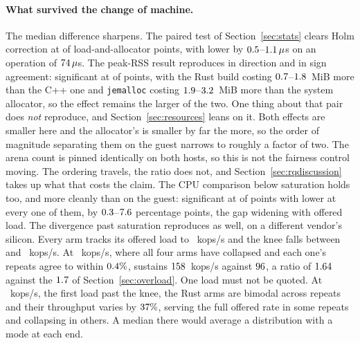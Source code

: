 \documentclass[english,oneside,a4paper,censored,csm,software-track-2020]{HYthesisML}
\begin{document}
\paragraph{What survived the change of machine.}
The median difference sharpens. The paired test of Section~\ref{sec:stats} clears Holm correction
at \BmPFiftySig{} of \BmPFiftyTested{} load-and-allocator points, with \BmPFiftyFaster{} lower by
$0.5$--$1.1\,\mu$s on an operation of $74\,\mu$s. The peak-RSS
result reproduces in direction and in sign agreement: significant at \BmRssSig{} of
\BmRssTested{} points, with the Rust build costing $0.7$--$1.8$~MiB more than
the C++ one and \texttt{jemalloc} costing $1.9$--$3.2$~MiB more than the
system allocator, so the \BmRssLargerEffect{} effect remains the larger of the two.
One thing about that pair does \emph{not} reproduce, and Section~\ref{sec:resources} leans on it.
Both effects are smaller here and the allocator's is smaller by far the more, so the order of
magnitude separating them on the guest narrows to roughly a factor of two. The arena count is pinned
identically on both hosts, so this is not the fairness control moving. The ordering travels, the
ratio does not, and Section~\ref{sec:rqdiscussion} takes up what that costs the claim.
The CPU comparison below saturation holds too, and more cleanly than on the guest: significant at
\BmCpuSig{} of \BmCpuTested{} points with \BmCpuLower{} lower at every one of them, by
$0.3$--$7.6$ percentage points, the gap widening with offered load.
The divergence past saturation reproduces as well, on a different vendor's silicon. Every arm
tracks its offered load to \BmTrackingMax{}~kops/s and the knee falls between \BmKneeLo{} and
\BmKneeHi{}~kops/s. At \BmOverloadLoad{}~kops/s, where all four arms have collapsed and each
one's repeats agree to within $0.4\%$, \BmOverloadFaster{} sustains
$158$~kops/s against $96$, a ratio of $1.64$ against
the $1.7$ of Section~\ref{sec:overload}.
One load must not be quoted. At \BmMetastableLoad{}~kops/s, the first load past the knee, the
Rust arms are bimodal across repeats and their throughput varies by $37\%$, serving
the full offered rate in some repeats and collapsing in others. A median there would average a
distribution with a mode at each end.
\end{document}
